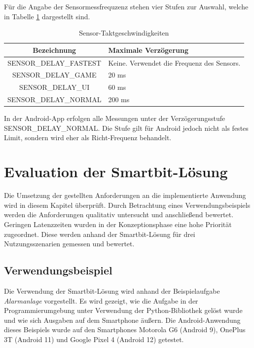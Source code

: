 \documentclass[11pt,a4paper]{report}
\begin{document}
Für  die Angabe der Sensormessfrequzenz stehen vier Stufen zur Auswahl, welche in Tabelle \ref{tab:sensor_speeds} dargestellt sind.
\begin{table}[htbp]
  \centering
  \begin{tabular}{|c|p{4cm}|}
      \hline
      \textbf{Bezeichnung} & \textbf{Maximale Verzögerung} \\
	  \hline
      SENSOR\_DELAY\_FASTEST & Keine. Verwendet die Frequenz des Sensors.\\
      \hline
      SENSOR\_DELAY\_GAME & 20 ms\\
      \hline
      SENSOR\_DELAY\_UI & 60 ms\\
      \hline
      SENSOR\_DELAY\_NORMAL & 200 ms\\
      \hline
  \end{tabular}
  \caption{Sensor-Taktgeschwindigkeiten\cite{sensor-takt}}
  \label{tab:sensor_speeds}
\end{table}
In der Android-App erfolgen alle Messungen unter der Verzögerungsstufe SENSOR\_DELAY\_NORMAL.
Die Stufe gilt für Android jedoch nicht als festes Limit, sondern wird eher als Richt-Frequenz behandelt.

\chapter{Evaluation der Smartbit-Lösung}\label{chap:eval}
Die Umsetzung der gestellten Anforderungen an die implementierte Anwendung wird in diesem Kapitel überprüft.
Durch Betrachtung eines Verwendungsbeispiels werden die Anforderungen qualitativ untersucht und anschließend bewertet.
Geringen Latenzzeiten wurden in der Konzeptionsphase eine hohe Priorität zugeordnet.
Diese werden anhand der Smartbit-Lösung für drei Nutzungsszenarien gemessen und bewertet.

\section{Verwendungsbeispiel}
Die Verwendung der Smartbit-Lösung wird anhand der Beispielaufgabe \textit{Alarmanlage} vorgestellt.
Es wird gezeigt, wie die Aufgabe in der Programmierumgebung unter Verwendung der Python-Bibliothek gelöst wurde und wie sich Ausgaben auf dem Smartphone äußern.
Die Android-Anwendung dieses Beispiels wurde auf den Smartphones Motorola G6 (Android 9), OnePlus 3T (Android 11) und Google Pixel 4 (Android 12) getestet.
\end{document}
